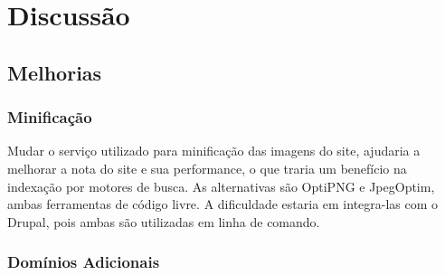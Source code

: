 \chapter{Discussão}



\section{Melhorias}

\subsection{Minificação}
Mudar o serviço utilizado para minificação das imagens do site, ajudaria a melhorar a nota do site e sua performance, o que traria um benefício na indexação por motores de busca. As alternativas são OptiPNG e JpegOptim, ambas ferramentas de código livre. A dificuldade estaria em integra-las com o Drupal, pois ambas são utilizadas em linha de comando.

\subsection{Domínios Adicionais}

\subsection{}